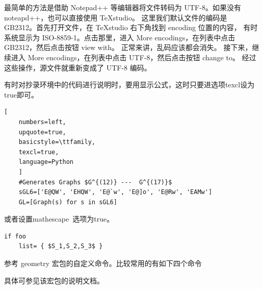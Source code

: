 
最简单的方法是借助 Notepad++ 等编辑器将文件转码为 UTF-8。如果没有 noteapd++，也可以直接使用 TeXstudio。
这里我们默认文件的编码是 GB2312。首先打开文件，在 TeXstudio 右下角找到 encoding 位置的内容，
有时系统显示为 ISO-8859-1。点击那里，进入 More encodings，在列表中点击 GB2312，然后点击按钮 view with。
正常来讲，乱码应该都会消失。 接下来，继续进入 More encodings，在列表中点击 UTF-8，然后点击按钮 change to。
经过这些操作，源文件就重新变成了 UTF-8 编码。



有时对抄录环境中的代码进行说明时，要用显示公式，这时只要进选项texcl设为true即可。

\begin{texlist}
  \begin{lstlisting}[
    numbers=left,
    upquote=true,
    basicstyle=\ttfamily,
    texcl=true,
    language=Python
    ]
    #Generates Graphs $G^{(12)} ---  G^{(17)}$
    sGL6=['E@QW', 'EHQW', 'E@`w', 'E@]o', 'E@Rw', 'EAMw']
    GL=[Graph(s) for s in sGL6]
  \end{lstlisting}
\end{texlist}
% 
% 

或者设置mathescape~选项为true。

\begin{texlist}
  \begin{lstlisting}[mathescape=true]
    if foo
    list= { $S_1,S_2,S_3$ }
  \end{lstlisting}
\end{texlist}





参考 geometry 宏包的自定义命令。比较常用的有如下四个命令
\begin{texlist}
  \restoregeometry
\end{texlist}
具体可参见该宏包的说明文档。


